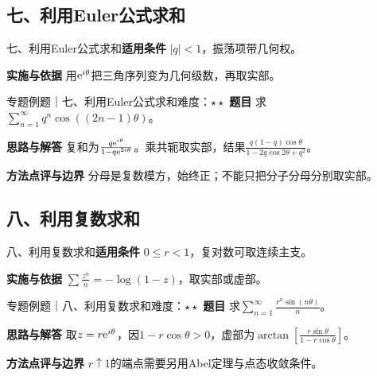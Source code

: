 \subsection{七、利用Euler公式求和}\label{mat:series_sum8:j7}
\begin{method}{七、利用Euler公式求和}\textbf{适用条件} $|q|<1$，振荡项带几何权。\par\textbf{实施与依据} 用$\mathrm{e}^{i\theta}$把三角序列变为几何级数，再取实部。\end{method}
\begin{example}{专题例题｜七、利用Euler公式求和}{难度：$\star\star$}
\textbf{题目} 求$\sum_{n=1}^\infty q^n\cos((2n-1)\theta)$。\par\textbf{思路与解答} 复和为$\frac{q\mathrm{e}^{i\theta}}{1-q\mathrm{e}^{2i\theta}}$。乘共轭取实部，结果$\frac{q(1-q)\cos\theta}{1-2q\cos2\theta+q^2}$。\par\textbf{方法点评与边界} 分母是复数模方，始终正；不能只把分子分母分别取实部。
\end{example}
\subsection{八、利用复数求和}\label{mat:series_sum8:j8}
\begin{method}{八、利用复数求和}\textbf{适用条件} $0\le r<1$，复对数可取连续主支。\par\textbf{实施与依据} $\sum \frac{z^n}{n}=-\log(1-z)$，取实部或虚部。\end{method}
\begin{example}{专题例题｜八、利用复数求和}{难度：$\star\star$}
\textbf{题目} 求$\sum_{n=1}^\infty \frac{r^n\sin(n\theta)}{n}$。\par\textbf{思路与解答} 取$z=r\mathrm{e}^{i\theta}$，因$1-r\cos\theta>0$，虚部为$\arctan[\frac{r\sin\theta}{1-r\cos\theta}]$。\par\textbf{方法点评与边界} $r\uparrow1$的端点需要另用Abel定理与点态收敛条件。
\end{example}
